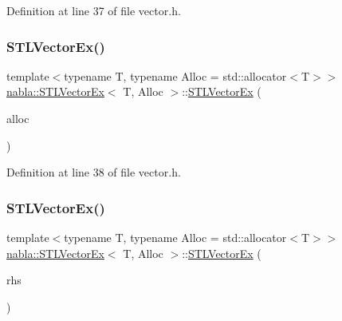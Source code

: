 Definition at line 37 of file vector.\+h.

\mbox{\label{classnabla_1_1_s_t_l_vector_ex_a271e7d8d10dd9371c08a1a0e6f7f8c27}} 
\subsubsection{\texorpdfstring{STLVectorEx()}{STLVectorEx()}\hspace{0.1cm}{\footnotesize\ttfamily [2/3]}}
{\footnotesize\ttfamily template$<$typename T, typename Alloc = std\+::allocator$<$\+T$>$$>$ \\
\mbox{\hyperlink{classnabla_1_1_s_t_l_vector_ex}{nabla\+::\+S\+T\+L\+Vector\+Ex}}$<$ T, Alloc $>$\+::\mbox{\hyperlink{classnabla_1_1_s_t_l_vector_ex}{S\+T\+L\+Vector\+Ex}} (\begin{DoxyParamCaption}\item[{Alloc $\ast$}]{alloc }\end{DoxyParamCaption})\hspace{0.3cm}{\ttfamily [inline]}}



Definition at line 38 of file vector.\+h.

\mbox{\label{classnabla_1_1_s_t_l_vector_ex_a806b14a4669228eac919caa37fcf9b75}} 
\subsubsection{\texorpdfstring{STLVectorEx()}{STLVectorEx()}\hspace{0.1cm}{\footnotesize\ttfamily [3/3]}}
{\footnotesize\ttfamily template$<$typename T, typename Alloc = std\+::allocator$<$\+T$>$$>$ \\
\mbox{\hyperlink{classnabla_1_1_s_t_l_vector_ex}{nabla\+::\+S\+T\+L\+Vector\+Ex}}$<$ T, Alloc $>$\+::\mbox{\hyperlink{classnabla_1_1_s_t_l_vector_ex}{S\+T\+L\+Vector\+Ex}} (\begin{DoxyParamCaption}\item[{const \mbox{\hyperlink{classnabla_1_1_s_t_l_vector_ex}{S\+T\+L\+Vector\+Ex}}$<$ T, Alloc $>$ \&}]{rhs }\end{DoxyParamCaption})\hspace{0.3cm}{\ttfamily [inline]}}



